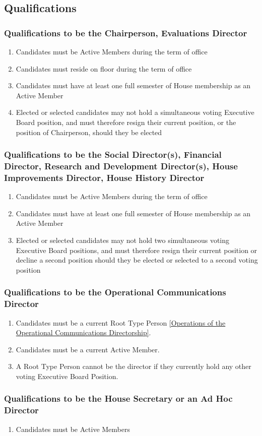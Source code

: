 \documentclass{article}
\newcommand{\asection}[1]{\subsection{#1} \label{#1}}
\newcommand{\asubsection}[1]{\subsubsection{#1} \label{#1}}
\begin{document}
\asection{Qualifications}
\asubsection{Qualifications to be the Chairperson, Evaluations Director}
\begin{enumerate}
	\item Candidates must be Active Members during the term of office
	\item Candidates must reside on floor during the term of office
	\item Candidates must have at least one full semester of House membership as an Active Member
	\item Elected or selected candidates may not hold a simultaneous voting Executive Board position, and must therefore resign their current position, or the position of Chairperson, should they be elected
\end{enumerate}
\asubsection{Qualifications to be the Social Director(s), Financial Director, Research and Development Director(s), House Improvements Director, House History Director}
\begin{enumerate}
	\item Candidates must be Active Members during the term of office
	\item Candidates must have at least one full semester of House membership as an Active Member
	\item Elected or selected candidates may not hold two simultaneous voting Executive Board positions, and must therefore resign their current position or decline a second position should they be elected or selected to a second voting position
\end{enumerate}
\asubsection{Qualifications to be the Operational Communications Director}
\begin{enumerate}
	\item Candidates must be a current Root Type Person \ref{Operations of the Operational Communications Directorship}.
	\item Candidates must be a current Active Member.
	\item A Root Type Person cannot be the director if they currently hold any other voting Executive Board Position.
\end{enumerate}

\asubsection{Qualifications to be the House Secretary or an Ad Hoc Director}
\begin{enumerate}
\item Candidates must be Active Members
\end{enumerate}
\end{document}
